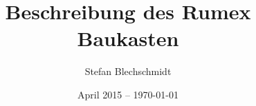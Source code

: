 \documentclass{report}
\title{Beschreibung des Rumex Baukasten}
\author{Stefan Blechschmidt}
\date{April 2015 -- \today}
\begin{document}
\VerbatimFootnotes



\maketitle

\tableofcontents






























\begin{appendix}





\end{appendix}

\end{document}
